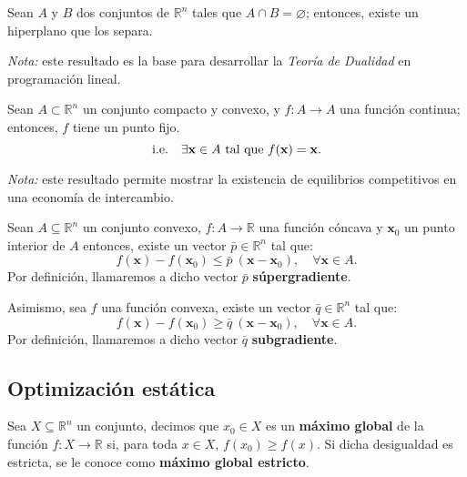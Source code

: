 \documentclass[8pt,a4paper]{extarticle}
\begin{document}
\begin{multicols}{3}
	\begin{boxtheo}[Minkowski]
		Sean $A$ y $B$ dos conjuntos de $\mathbb{R}^n$ tales que $A \cap B = \varnothing$; entonces, existe un hiperplano que los separa.
	\end{boxtheo}

	\emph{Nota:} este resultado es la base para desarrollar la \emph{Teoría de Dualidad} en programación lineal.

	\begin{boxtheo}
		Sean $A \subset \mathbb{R}^n$ un conjunto compacto y convexo, y $f : A \to A$ una función continua; entonces, $f$ tiene un punto fijo.
		\[
			\text{\normalfont i.e.} \quad \exists \mathbf{x} \in A \text{ tal que } f(\mathbf{x}) = \mathbf{x}.
		\]
	\end{boxtheo}
	
	\emph{Nota:} este resultado permite mostrar la existencia de equilibrios competitivos en una economía de intercambio.

	\newpage

	\begin{boxtheo}
		Sean $A \subseteq \mathbb{R}^n$ un conjunto convexo, $f : A \to \mathbb{R}$ una función cóncava y $\mathbf{x}_0$ un punto interior de $A$ entonces, existe un vector $\bar{p} \in \mathbb{R}^n$ tal que:
		\[f(\mathbf{x}) - f(\mathbf{x}_0) \leq \bar{p}\ (\mathbf{x} - \mathbf{x}_0), \quad \forall \mathbf{x} \in A.\]
		Por definición, llamaremos a dicho vector $\bar{p}$ \textbf{súpergradiente}. \par
		Asimismo, sea $f$ una función convexa, existe un vector $\bar{q} \in \mathbb{R}^n$ tal que:
		\[f(\mathbf{x}) - f(\mathbf{x}_0) \geq \bar{q}\ (\mathbf{x} - \mathbf{x}_0), \quad \forall \mathbf{x} \in A.\]
		Por definición, llamaremos a dicho vector $\bar{q}$ \textbf{subgradiente}.
	\end{boxtheo}
	
	\sectionbreak

	\subsection{Optimización estática}

	\begin{boxdef}
		Sea $X \subseteq \mathbb{R}^{n}$ un conjunto, decimos que $x_0 \in X$ es un \textbf{máximo global} de la función $f : X \to \mathbb{R}$ si, para toda $x \in X$, $f(x_0) \geq f(x)$. Si dicha desigualdad es estricta, se le conoce como \textbf{máximo global estricto}.
	\end{boxdef}


\end{multicols}
\end{document}
